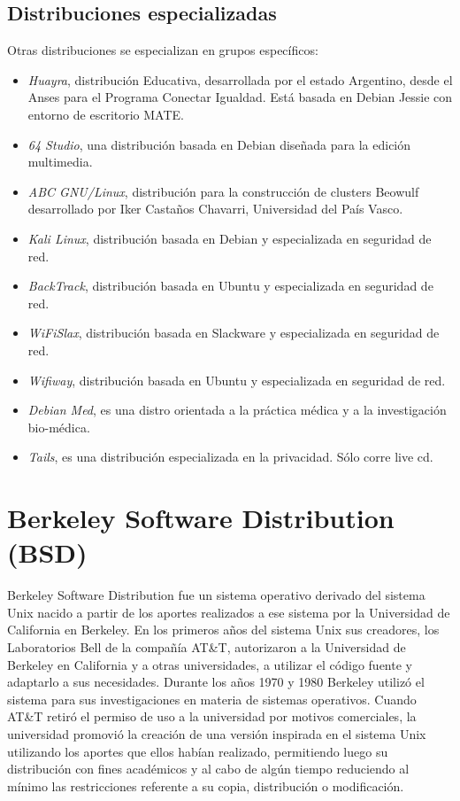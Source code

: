 \subsection{Distribuciones especializadas}
Otras distribuciones se especializan en grupos específicos:

\begin{itemize}
	\item \textit{Huayra}, distribución Educativa, desarrollada por el estado Argentino, desde el Anses para el Programa Conectar Igualdad. Está basada en Debian Jessie con entorno de escritorio MATE.
	\item \textit{64 Studio}, una distribución basada en Debian diseñada para la edición multimedia.
	\item \textit{ABC GNU/Linux}, distribución para la construcción de clusters Beowulf desarrollado por Iker Castaños Chavarri, Universidad del País Vasco.
	\item \textit{Kali Linux}, distribución basada en Debian y especializada en seguridad de red.
	\item \textit{BackTrack}, distribución basada en Ubuntu y especializada en seguridad de red.
	\item \textit{WiFiSlax}, distribución basada en Slackware y especializada en seguridad de red.
	\item \textit{Wifiway}, distribución basada en Ubuntu y especializada en seguridad de red.
	\item \textit{Debian Med}, es una distro orientada a la práctica médica y a la investigación bio-médica.
	\item \textit{Tails}, es una distribución especializada en la privacidad. Sólo corre live cd.
\end{itemize}


\section{Berkeley Software Distribution (BSD)}

Berkeley Software Distribution fue un sistema operativo derivado del sistema Unix nacido a partir de los aportes realizados a ese sistema por la Universidad de California en Berkeley. En los primeros años del sistema Unix sus creadores, los Laboratorios Bell de la compañía AT\&T, autorizaron a la Universidad de Berkeley en California y a otras universidades, a utilizar el código fuente y adaptarlo a sus necesidades.
Durante los años 1970 y 1980 Berkeley utilizó el sistema para sus investigaciones en materia de sistemas operativos. Cuando AT\&T retiró el permiso de uso a la universidad por motivos comerciales, la universidad promovió la creación de una versión inspirada en el sistema Unix utilizando los aportes que ellos habían realizado, permitiendo luego su distribución con fines académicos y al cabo de algún tiempo reduciendo al mínimo las restricciones referente a su copia, distribución o modificación.

